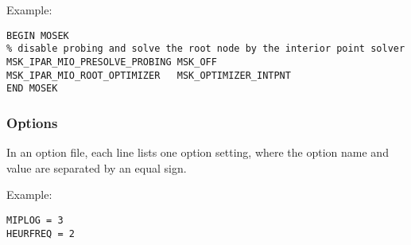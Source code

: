 Example:
\begin{verbatim}
BEGIN MOSEK
% disable probing and solve the root node by the interior point solver
MSK_IPAR_MIO_PRESOLVE_PROBING MSK_OFF
MSK_IPAR_MIO_ROOT_OPTIMIZER   MSK_OPTIMIZER_INTPNT
END MOSEK
\end{verbatim}

\subsubsection{\OSIXPRESS Options}
In an \OSIXPRESS option file, each line lists one option setting, where the option name and value are separated by an equal sign.

Example:
\begin{verbatim}
MIPLOG = 3
HEURFREQ = 2
\end{verbatim}





\chapterend
